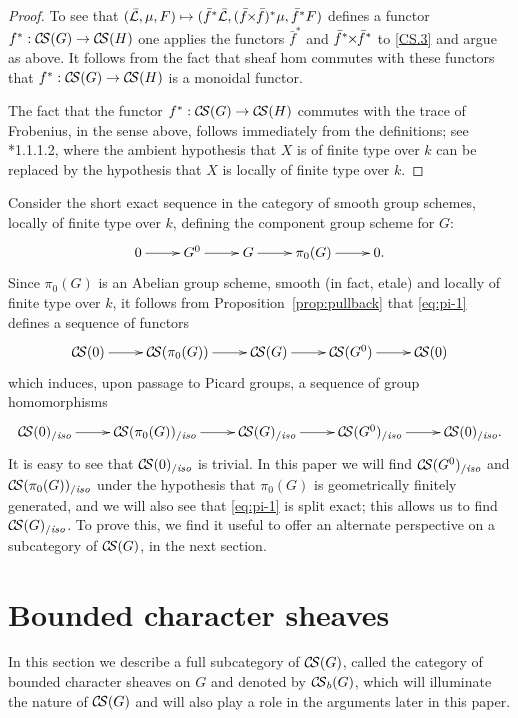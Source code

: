 \documentclass[11pt]{amsart}
\theoremstyle{plain}
\theoremstyle{definition}
\theoremstyle{remark}
\newcommand{\Fq}{k}
\newcommand{\gcs}[1]{{\mathcal{\bar #1}}}
\newcommand{\CS}{{\mathcal{C\hskip-1.8pt S}}}
\newcommand{\CSiso}[1]{\CS(#1)_{/\textit{iso}}}
\newcommand{\tightertimes}{\hskip-3pt\times\hskip-3pt}
\renewcommand{\bf}{\bar{f}}
\newcommand{\bfxf}{\bar{f} \tightertimes \bar{f}}
\newcommand\Clifton[1]{\marginpar{\smaller\smaller CC: #1}}
\begin{document}
\begin{proof}
  To see that $(\gcs{L},\mu,F) \mapsto (\bf^*\gcs{L},(\bfxf)^*\mu,\bf^*F)$
  defines a functor $f^* : \CS(G) \to \CS(H)$ one applies the functors $\bf^*$ and
  $\bf^*\tightertimes\bf^*$ to \ref{CS.3} and argue as
  above. It follows from the fact that sheaf hom commutes with these
  functors that $f^* : \CS(G) \to \CS(H)$ is a monoidal functor.

  The fact that the functor $f^* : \CS(G) \to \CS(H)$ commutes with
  the trace of Frobenius, in the sense above, follows immediately from
  the definitions; see \cite{Laumon}*{1.1.1.2}, where the ambient
  hypothesis that $X$ is of finite type over $\Fq$ can be replaced by
  the hypothesis that $X$ is locally of finite type over $\Fq$.
  \Clifton{I have not proved $(f\circ g)^* = g^* \circ f^*$, yet.}
\end{proof}

Consider the short exact sequence in the category of smooth group
schemes, locally of finite type over $\Fq$, defining the component
group scheme for $G$:
 \begin{equation}\label{eq:pi-2}
   \xymatrix{
     0 \ar[r] & G^0 \ar[r] & G \ar[r] & \pi_0(G) \ar[r] & 0.
    }
 \end{equation}
Since $\pi_0(G)$ is an Abelian group scheme, smooth (in fact, etale) and locally of finite type over $\Fq$, 
it follows from Proposition~\ref{prop:pullback} that \eqref{eq:pi-1} defines a sequence of functors
 \[
  \xymatrix{
\CS(0) \ar[r] & \CS(\pi_0(G)) \ar[r] & \CS(G) \ar[r] & \CS(G^0) \ar[r] & \CS(0)
  }
 \]
which induces, upon passage to Picard groups, a sequence of group homomorphisms 
 \begin{equation}\label{eq:pi-1}
  \xymatrix{
\CSiso{0} \ar[r] & \CSiso{\pi_0(G)} \ar[r] & \CSiso{G} \ar[r] & \CSiso{G^0} \ar[r] & \CSiso{0}.
  }
 \end{equation}
It is easy to see that $\CSiso{0}$ is trivial. In this paper we will find $\CSiso{G^0}$ and $\CSiso{\pi_0(G)}$ under the hypothesis that $\pi_0(G)$ is geometrically finitely generated, and we will also see that \eqref{eq:pi-1} is split exact; this allows us to find $\CSiso{G}$. To prove this, we find it useful to offer an alternate perspective on a subcategory of $\CS(G)$, in the next section.
 
\section{Bounded character sheaves}

In this section we describe a full subcategory of $\CS(G)$, called the category of bounded character sheaves on $G$ and denoted by $\CS_b(G)$, which will illuminate the nature of $\CS(G)$ and will also play a role in the arguments later in this paper.
\end{document}
